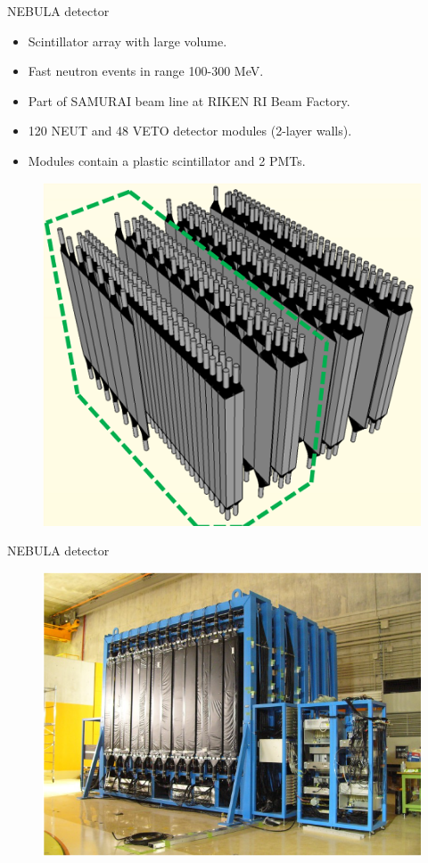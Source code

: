 \documentclass[11pt]{beamer}
\begin{document}
\begin{frame}{NEBULA detector}
    \begin{itemize}
        \item<tri@1-> Scintillator array with large volume.
        \item<tri@1-> Fast neutron events in range 100-300 MeV.
        \item<tri@1-> Part of SAMURAI beam line at RIKEN RI Beam Factory.
        \item<tri@1-> 120 NEUT and 48 VETO detector modules (2-layer walls).
        \item<tri@1-> Modules contain a plastic scintillator and 2 PMTs.
    \end{itemize}
    \begin{figure}
        \centering
        \includegraphics[scale = 0.6]{walls.png}
    \end{figure}
\end{frame}

\begin{frame}{NEBULA detector}
    \begin{figure}
        \centering
        \includegraphics[scale = 0.8]{nebulakep.png}
    \end{figure} 
\end{frame}
\end{document}
